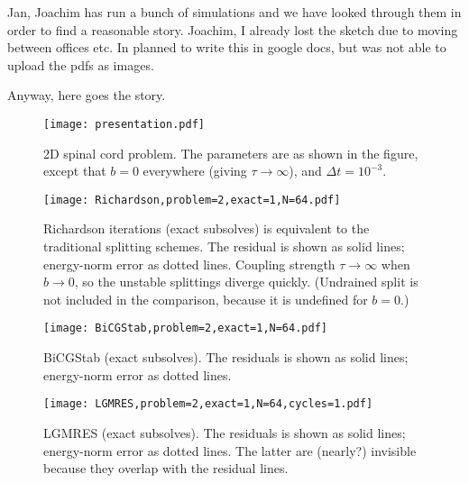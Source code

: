 \documentclass{article}
\begin{document}
Jan, Joachim has run a bunch of simulations and we have looked through them in order to find a reasonable story. 
Joachim, I already lost the sketch due to moving between offices etc. In planned to write this in google
docs, but was not able to upload the pdfs as images.  

Anyway, here goes the story. 


\begin{figure}
\begin{center}
\texttt{[image: presentation.pdf]}
\caption{2D spinal cord problem. The parameters are as shown in the figure, except that $b=0$ everywhere (giving $\tau\rightarrow\infty$), and $\Delta t=10^{-3}$.}
\end{center}
\end{figure}

\begin{figure}
\begin{center}
\texttt{[image: Richardson,problem=2,exact=1,N=64.pdf]}
\caption{Richardson iterations (exact subsolves) is equivalent to the traditional splitting schemes. The residual is shown as solid lines; energy-norm error as dotted lines. Coupling strength $\tau\rightarrow\infty$ when $b\rightarrow 0$, so the unstable splittings diverge quickly. (Undrained split is not included in the comparison, because it is undefined for $b=0$.)} 
\label{2dsc-richardson-exact}
\end{center}
\end{figure}

\begin{figure}
\begin{center}
\texttt{[image: BiCGStab,problem=2,exact=1,N=64.pdf]}
\caption{BiCGStab (exact subsolves). The residuals is shown as solid lines; energy-norm error as dotted lines.}
\label{2dsc-bicgstab-exact}
\end{center}
\end{figure}

\begin{figure}
\begin{center}
\texttt{[image: LGMRES,problem=2,exact=1,N=64,cycles=1.pdf]}
\caption{LGMRES (exact subsolves). The residuals is shown as solid lines; energy-norm error as dotted lines. The latter are (nearly?) invisible because they overlap with the residual lines.}
\label{2dsc-lgmres-exact}
\end{center}
\end{figure}
\end{document}
